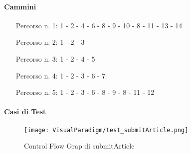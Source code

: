 \paragraph{Cammini}
\begin{itemize}
\item[Percorso n. 1: ] 1 - 2 - 4 - 6 - 8 - 9 - 10 - 8 - 11 - 13 - 14
\item[Percorso n. 2: ] 1 - 2 - 3 
\item[Percorso n. 3: ] 1 - 2 - 4 - 5
\item[Percorso n. 4: ] 1 - 2 - 3 - 6 - 7  
\item[Percorso n. 5: ] 1 - 2 - 3 - 6 - 8 - 9 - 8 - 11 - 12
\end{itemize}
\paragraph{Casi di Test}
\begin{figure}[ht]
  \centering
  \texttt{[image: VisualParadigm/test\_submitArticle.png]}
  \caption{Control Flow Grap di submitArticle}
  \label{fig:cfg_submitArticle }
\end{figure}
